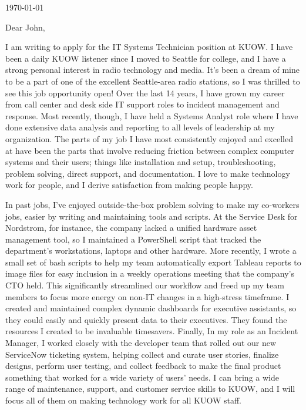 \documentclass[10pt,oneside]{article}
\begin{document}
\hfill\dte\today
\heading
\vspace{\baselineskip}
\vspace{\baselineskip}

Dear John,

\vspace{\baselineskip}

I am writing to apply for the IT Systems Technician position at KUOW. I have been a daily KUOW listener since I moved to Seattle for college, and I have a strong personal interest in radio technology and media. It's been a dream of mine to be a part of one of the excellent Seattle-area radio stations, so I was thrilled to see this job opportunity open! Over the last 14 years, I have grown my career from call center and desk side IT support roles to incident management and response. Most recently, though, I have held a Systems Analyst role where I have done extensive data analysis and reporting to all levels of leadership at my organization. The parts of my job I have most consistently enjoyed and excelled at have been the parts that involve reducing friction between complex computer systems and their users; things like installation and setup, troubleshooting, problem solving, direct support, and documentation. I love to make technology work for people, and I derive satisfaction from making people happy.

\vspace{\baselineskip}

In past jobs, I’ve enjoyed outside-the-box problem solving to make my co-workers jobs, easier by writing and maintaining tools and scripts. At the Service Desk for Nordstrom, for instance, the company lacked a unified hardware asset management tool, so I maintained a PowerShell script that tracked the department’s workstations, laptops and other hardware. More recently, I wrote a small set of bash scripts to help my team automatically export Tableau reports to image files for easy inclusion in a weekly operations meeting that the company’s CTO held. This significantly streamlined our workflow and freed up my team members to focus more energy on non-IT changes in a high-stress timeframe. I created and maintained complex dynamic dashboards for executive assistants, so they could easily and quickly present data to their executives. They found the resources I created to be invaluable timesavers. Finally, In my role as an Incident Manager, I worked closely with the developer team that rolled out our new ServiceNow ticketing system, helping collect and curate user stories, finalize designs, perform user testing, and collect feedback to make the final product something that worked for a wide variety of users' needs. I can bring a wide range of maintenance, support, and customer service skills to KUOW, and I will focus all of them on making technology work for all KUOW staff.
\end{document}

